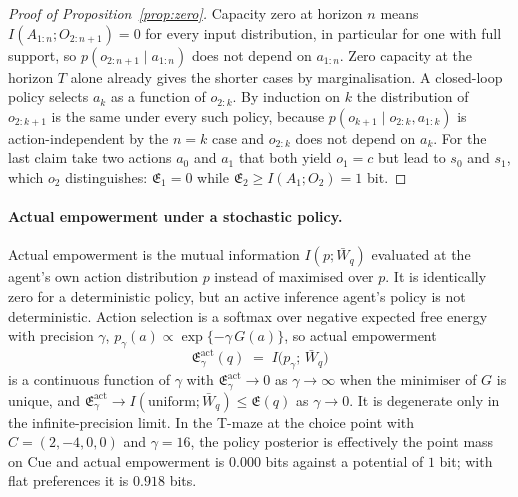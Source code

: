 \documentclass[letterpaper]{article} %
\theoremstyle{definition}
\providecommand{\Emp}{\mathfrak{E}}
\begin{document}
\begin{proof}[Proof of Proposition~\ref{prop:zero}]
Capacity zero at horizon $n$ means $I(A_{1:n}; O_{2:n+1}) = 0$ for every input distribution, in particular for one with full support, so $p(o_{2:n+1} \mid a_{1:n})$ does not depend on $a_{1:n}$. Zero capacity at the horizon $T$ alone already gives the shorter cases by marginalisation. A closed-loop policy selects $a_k$ as a function of $o_{2:k}$. By induction on $k$ the distribution of $o_{2:k+1}$ is the same under every such policy, because $p(o_{k+1} \mid o_{2:k}, a_{1:k})$ is action-independent by the $n = k$ case and $o_{2:k}$ does not depend on $a_k$. For the last claim take two actions $a_0$ and $a_1$ that both yield $o_1 = c$ but lead to $s_0$ and $s_1$, which $o_2$ distinguishes: $\Emp_1 = 0$ while $\Emp_2 \ge I(A_1; O_2) = 1$ bit.
\end{proof}

\paragraph{Actual empowerment under a stochastic policy.}
Actual empowerment is the mutual information $I(p; \bar W_q)$ evaluated at the agent's own action distribution $p$ instead of maximised over $p$. It is identically zero for a deterministic policy, but an active inference agent's policy is not deterministic. Action selection is a softmax over negative expected free energy with precision $\gamma$, $p_\gamma(a) \propto \exp\{-\gamma\, G(a)\}$, so actual empowerment
\begin{equation}
  \Emp^{\mathrm{act}}_\gamma(q) \;=\; I\big(p_\gamma;\, \bar W_q\big)
\end{equation}
is a continuous function of $\gamma$ with $\Emp^{\mathrm{act}}_\gamma \to 0$ as $\gamma \to \infty$ when the minimiser of $G$ is unique, and $\Emp^{\mathrm{act}}_\gamma \to I(\text{uniform}; \bar W_q) \le \Emp(q)$ as $\gamma \to 0$. It is degenerate only in the infinite-precision limit. In the T-maze at the choice point with $C = (2, -4, 0, 0)$ and $\gamma = 16$, the policy posterior is effectively the point mass on Cue and actual empowerment is $0.000$ bits against a potential of $1$ bit; with flat preferences it is $0.918$ bits.
\end{document}
